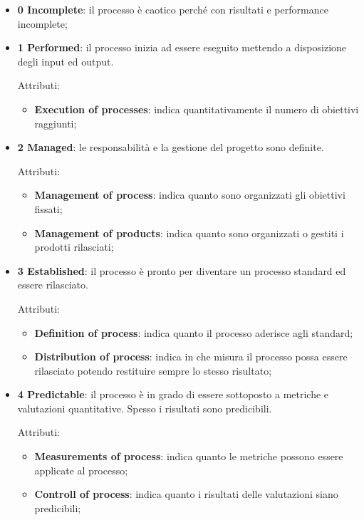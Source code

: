 \begin{itemize}
	\item \textbf{0 Incomplete}: il processo è caotico perché con risultati e performance incomplete;

	\item \textbf{1 Performed}: il processo inizia ad essere eseguito mettendo a disposizione degli input ed output.
	
	Attributi:
	
	\begin{itemize}
		\item \textbf{Execution of processes}: indica quantitativamente il numero di obiettivi raggiunti;
	\end{itemize}

	\item \textbf{2 Managed}: le responsabilità e la gestione del progetto sono definite.
	
	Attributi:
	
	\begin{itemize}
		\item \textbf{Management of process}: indica quanto sono organizzati gli obiettivi fissati;
		\item \textbf{Management of products}: indica quanto sono organizzati o gestiti i prodotti rilasciati;
	\end{itemize}

	\item \textbf{3 Established}: il processo è pronto per diventare un processo standard ed essere rilasciato.
	
	Attributi:
	
	\begin{itemize}
		\item \textbf{Definition of process}: indica quanto il processo aderisce agli standard;
		\item \textbf{Distribution of process}: indica in che misura il processo possa essere rilasciato potendo restituire sempre lo stesso risultato;
	\end{itemize}

	\item \textbf{4 Predictable}: il processo è in grado di essere sottoposto a metriche e valutazioni quantitative. Spesso i risultati sono predicibili.
	
	Attributi:
	
	\begin{itemize}
		\item \textbf{Measurements of process}: indica quanto le metriche possono essere applicate al processo;
		\item \textbf{Controll of process}: indica quanto i risultati delle valutazioni siano predicibili;
	\end{itemize}


\end{itemize}
